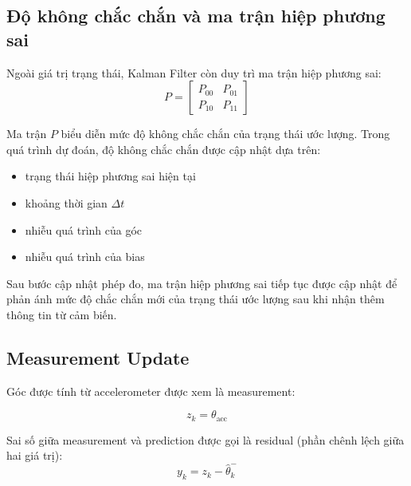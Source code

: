 
\subsection{Độ không chắc chắn và ma trận hiệp phương sai}

Ngoài giá trị trạng thái, Kalman Filter còn duy trì ma trận hiệp phương sai:
\begin{equation}
P=
\begin{bmatrix}
P_{00} & P_{01}\\
P_{10} & P_{11}
\end{bmatrix}
\end{equation}

Ma trận $P$ biểu diễn mức độ không chắc chắn của trạng thái ước lượng. Trong quá trình dự đoán, độ không chắc chắn được cập nhật dựa trên:
\begin{itemize}
    \item trạng thái hiệp phương sai hiện tại
    \item khoảng thời gian $\Delta t$
    \item nhiễu quá trình của góc
    \item nhiễu quá trình của bias
\end{itemize}

Sau bước cập nhật phép đo, ma trận hiệp phương sai tiếp tục được cập nhật để phản ánh mức độ chắc chắn mới của trạng thái ước lượng sau khi nhận thêm thông tin từ cảm biến.


\subsection{Measurement Update}

Góc được tính từ accelerometer được xem là measurement:

\begin{equation}
z_k = \theta_{\text{acc}}
\end{equation}

Sai số giữa measurement và prediction được gọi là residual (phần chênh lệch giữa hai giá trị):
\begin{equation}
y_k
=
z_k
-
\hat{\theta}_k^{-}
\end{equation}

